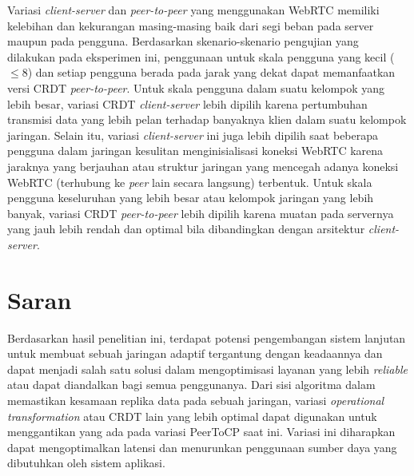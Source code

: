 Variasi \textit{client-server} dan \textit{peer-to-peer} yang menggunakan WebRTC memiliki kelebihan dan kekurangan masing-masing baik dari segi beban pada server maupun pada pengguna. Berdasarkan skenario-skenario pengujian yang dilakukan pada eksperimen ini, penggunaan untuk skala pengguna yang kecil ($\leq 8$) dan setiap pengguna berada pada jarak yang dekat dapat memanfaatkan versi CRDT \textit{peer-to-peer}. Untuk skala pengguna dalam suatu kelompok yang lebih besar, variasi CRDT \textit{client-server} lebih dipilih karena pertumbuhan transmisi data yang lebih pelan terhadap banyaknya klien dalam suatu kelompok jaringan. Selain itu, variasi \textit{client-server} ini juga lebih dipilih saat beberapa pengguna dalam jaringan kesulitan menginisialisasi koneksi WebRTC karena jaraknya yang berjauhan atau struktur jaringan yang mencegah adanya koneksi WebRTC (terhubung ke \textit{peer} lain secara langsung) terbentuk. Untuk skala pengguna keseluruhan yang lebih besar atau kelompok jaringan yang lebih banyak, variasi CRDT \textit{peer-to-peer} lebih dipilih karena muatan pada servernya yang jauh lebih rendah dan optimal bila dibandingkan dengan arsitektur \textit{client-server}.

\section{Saran}
\label{sec:saran}

Berdasarkan hasil penelitian ini, terdapat potensi pengembangan sistem lanjutan untuk membuat sebuah jaringan adaptif tergantung dengan keadaannya dan dapat menjadi salah satu solusi dalam mengoptimisasi layanan yang lebih \textit{reliable} atau dapat diandalkan bagi semua penggunanya. Dari sisi algoritma dalam memastikan kesamaan replika data pada sebuah jaringan, variasi \textit{operational transformation} atau CRDT lain yang lebih optimal dapat digunakan untuk menggantikan yang ada pada variasi PeerToCP saat ini. Variasi ini diharapkan dapat mengoptimalkan latensi dan menurunkan penggunaan sumber daya yang dibutuhkan oleh sistem aplikasi.

